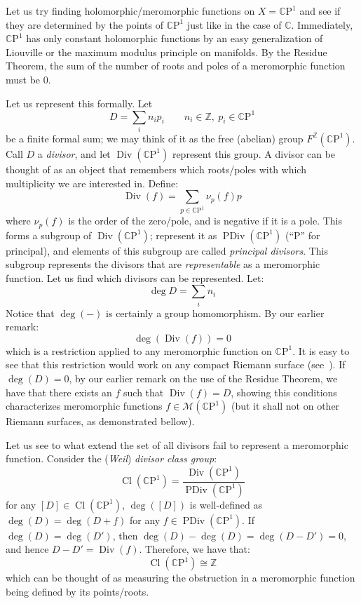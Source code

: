 \documentclass{book}
\newcommand{\Z}{{\mathbb{Z}}}
\newcommand{\C}{{\mathbb{C}}}
\newcommand{\CM}{{\mathcal{M}}}
\newcommand{\CP}{{\mathbb{C}\mathrm{P}}}
\newcommand{\Div}{{\operatorname{Div}}}
\newcommand{\PDiv}{{\operatorname{PDiv}}}
\renewcommand{\deg}{{\operatorname{deg}}}
\renewcommand{\div}{{\operatorname{Div}}}
\newcommand{\Cl}{{\operatorname{Cl}}}
\begin{document}
Let us try finding holomorphic/meromorphic functions on $X = \CP^1$ and see if they are
determined by the points of $\CP^1$ just like in the case of $\C$. Immediately, $\CP^1$ has only constant holomorphic functions by an easy
generalization of Liouville or the maximum modulus principle on manifolds. By the Residue Theorem, the sum of
the number of roots and poles of a meromorphic function must be $0$.

Let us represent this formally. Let
\[
  D = \sum_i n_ip_i \qquad n_i\in \Z,\ p_i \in \CP^1
\]
be a finite formal sum; we may think of it as the free (abelian) group $F^{\Z}(\CP^1)$. Call $D$
a \emph{divisor}, and let $\Div(\CP^1)$
represent this group. A divisor can be thought of as an object that remembers which roots/poles with which
multiplicity we are interested in. Define:
\[
  \div(f) =  \sum_{p \in \CP^1} \nu_{p}(f)p
\]
where $\nu_{p}(f)$ is the order of the zero/pole, and is negative if it is a pole. This forms a subgroup of
$\Div(\CP^1)$; represent it as $\PDiv(\CP^1)$ (``P'' for principal), and elements of this subgroup are called
\emph{principal divisors}. This subgroup represents the divisors that are \emph{representable} as a
meromorphic function. Let us find which divisors can be represented. Let:
\[
  \deg D = \sum_i n_i
\]
Notice that $\deg(-)$ is certainly a group homomorphism. By our earlier remark:
\[
  \deg(\div(f)) = 0
\]
which is a restriction applied to any meromorphic function on $\CP^1$. It is easy to see that this restriction
would work on any compact Riemann surface (see~\cite[chapter~6]{NateComplexAnalysis}). If $\deg(D) = 0$, by
our earlier remark on the use of the Residue Theorem, we have that there exists an $f$ such that $\div(f) = D$,
showing this conditions characterizes meromorphic functions $f \in \CM(\CP^1)$ (but it shall not on other
Riemann surfaces, as demonstrated bellow).

Let us see to what extend the set of all divisors fail to represent a meromorphic function. Consider the
(\emph{Weil})\emph{ divisor class group}:
\[
  \Cl(\CP^1) = \frac{\Div(\CP^1)}{\PDiv(\CP^1)}
\]
for any $[D] \in \Cl(\CP^1)$,  $\deg([D])$ is well-defined as $\deg(D) = \deg(D + f)$ for any $f \in
\PDiv(\CP^1)$. If $\deg(D) = \deg(D')$, then $\deg(D) - \deg(D) = \deg(D-D') = 0$, and hence $D-D'
= \div(f)$. Therefore, we have that:
\[
  \Cl(\CP^1) \cong \Z
\]
which can be thought of as measuring the obstruction in a meromorphic function being defined by its
points/roots.
\end{document}
